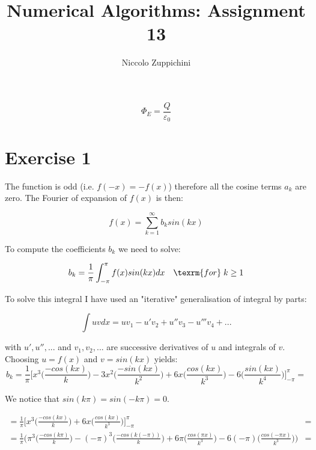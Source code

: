 \documentclass[12pt]{article}
\title{Numerical Algorithms: Assignment 13}
\author{Niccolo Zuppichini}
\begin{document}
\maketitle
\begin{equation}
\Phi_{E}=\frac{Q}{\varepsilon_{0}}
\end{equation}
\section*{Exercise 1}

The function is odd (i.e. $f(-x) = -f(x)$) therefore all the cosine terms $a_k$ are zero. The Fourier of expansion of $f(x)$ is then:

\begin{equation}
	f(x) = \sum_{k=1}^{\infty} b_k sin(kx)
\end{equation}

To compute the coefficients $b_k$ we need to solve: 

\begin{equation}
	b_k = \frac{1}{\pi} \int_{- \pi}^{\pi} f(x) sin(kx) dx \quad \texrm{for} \; k \geq 1
\end{equation}

To solve this integral I have used an "iterative" generalisation of integral by parts:

\begin{equation}
	\int u v dx = u v_1 - u' v_2 + u'' v_3 - u''' v_4 + ...
\end{equation}

with $u', u'', ...$ and $v_1, v_2, ...$ are successive derivatives of $u$ and integrals of $v$.  Choosing $u = f(x)$ and $v = sin(kx)$ yields: \\

\begin{equation}
	b_k = \frac{1}{\pi} \bigg[ 
	x^3 \big(\frac{-cos(kx)}{k} \big) 
	-3x^2 \big( \frac{-sin(kx)}{k^2} \big) 
	+ 6x \big( \frac{cos(kx)}{k^3} \big)
	- 6 \big( \frac{sin(kx)}{k^4} \big) 
	\bigg]_{- \pi}^{\pi} =
\end{equation}

We notice that $sin(k \pi) = sin(-k \pi) = 0$. 

\begin{equation}
\begin{split}
	= \frac{1}{\pi} \bigg[ 
	x^3 \big(\frac{-cos(kx)}{k} \big) 
	+ 6x \big( \frac{cos(kx)}{k^3} \big)
	\bigg]_{- \pi}^{\pi} &=  \\
	= \frac{1}{\pi} \bigg( 
	\pi^3 \big(\frac{-cos(k \pi)}{k} \big)
	- (-\pi)^3 \big(\frac{-cos(k (-\pi))}{k} \big) 
	+ 6\pi \big( \frac{cos(\pi x)}{k^3} \big)
	- 6(-\pi) \big( \frac{cos(- \pi x)}{k^3} \big)
	\bigg) &=
\end{split}
\end{equation}
	
\end{document}
